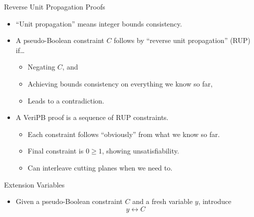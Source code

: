 \documentclass[aspectratio=169,compress,10pt]{beamer}
\begin{document}
\begin{frame}{Reverse Unit Propagation Proofs}
    \begin{itemize}
        \item ``Unit propagation'' means integer bounds consistency.
        \item A pseudo-Boolean constraint $C$ follows by ``reverse unit propagation'' (RUP) if\ldots
            \begin{itemize}
                \item Negating $C$, and
                \item Achieving bounds consistency on everything we know so far,
                \item Leads to a contradiction.
            \end{itemize}
        \item A VeriPB proof is a sequence of RUP constraints.
            \begin{itemize}
                \item Each constraint follows ``obviously'' from what we know so far.
                \item Final constraint is $0 \ge 1$, showing unsatisfiability.
                \item Can interleave cutting planes when we need to.
            \end{itemize}
    \end{itemize}
\end{frame}

\begin{frame}{Extension Variables}
    \begin{itemize}
        \item Given a pseudo-Boolean constraint $C$ and a fresh variable $y$, introduce
            \[ y \leftrightarrow C \]
    \end{itemize}
\end{frame}
\end{document}
